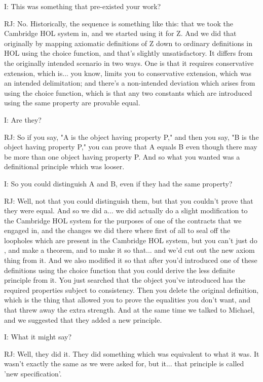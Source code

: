 \documentclass[10pt,titlepage]{book}
\begin{document}
I: This was something that pre-existed your work?

RJ: No. Historically, the sequence is something like this: that we took the Cambridge HOL system in, and we started using it for Z. And we did that originally by mapping axiomatic definitions of Z down to ordinary definitions in HOL using the choice function, and that's slightly unsatisfactory. It differs from the originally intended scenario in two ways. One is that it requires conservative extension, which is... you know, limits you to conservative extension, which was an intended delimitation; and there's a non-intended deviation which arises from using the choice function, which is that any two constants which are introduced using the same property are provable equal.

I: Are they?

RJ: So if you say, "A is the object having property P," and then you say, "B is the object having property P," you can prove that A equals B even though there may be more than one object having property P. And so what you wanted was a definitional principle which was looser.

I: So you could distinguish A and B, even if they had the same property?

RJ: Well, not that you could distinguish them, but that you couldn't prove that they were equal. And so we did a... we did actually do a slight modification to the Cambridge HOL system for the purposes of one of the contracts that we engaged in, and the changes we did there where first of all to seal off the loopholes which are present in the Cambridge HOL system, but you can't just do 	, and make a theorem, and to make it so that... and we'd cut out the new axiom thing from it. And we also modified it so that after you'd introduced one of these definitions using the choice function that you could derive the less definite principle from it. You just searched that the object you've introduced has the required properties subject to consistency. Then you delete the original definition, which is the thing that allowed you to prove the equalities you don't want, and that threw away the extra strength. And at the same time we talked to Michael, and we suggested that they added a new principle.

I: What it might say?

RJ: Well, they did it. They did something which was equivalent to what it was.
It wasn't exactly the same as we were asked for, but it... that principle is called 'new specification'.
\end{document}
